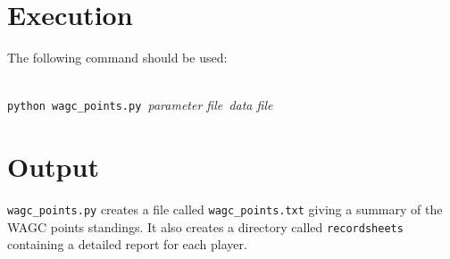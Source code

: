 \documentclass{article}
\begin{document}
\section{Execution}

The following command should be used:

\noindent\\
\texttt{python wagc\_points.py}\emph{\ \flq parameter file\frq\ \flq data file\frq}

\section{Output}

\texttt{wagc\_points.py} creates a file called \texttt{wagc\_points.txt} giving a summary of the WAGC points standings. It also 
creates a directory called \texttt{recordsheets} containing a detailed report for each player.
\end{document}
